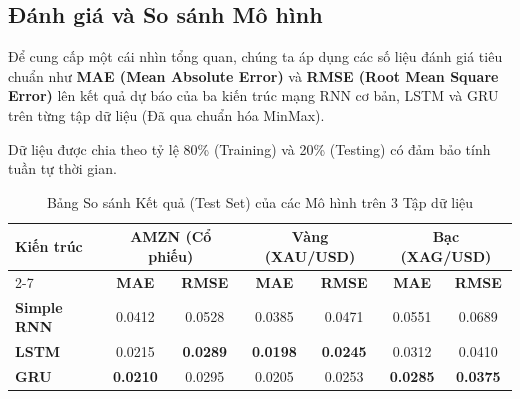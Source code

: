 \newpage
\subsection{Đánh giá và So sánh Mô hình}

Để cung cấp một cái nhìn tổng quan, chúng ta áp dụng các số liệu đánh giá tiêu chuẩn như \textbf{MAE (Mean Absolute Error)} và \textbf{RMSE (Root Mean Square Error)} lên kết quả dự báo của ba kiến trúc mạng RNN cơ bản, LSTM và GRU trên từng tập dữ liệu (Đã qua chuẩn hóa MinMax). 

Dữ liệu được chia theo tỷ lệ 80\% (Training) và 20\% (Testing) có đảm bảo tính tuần tự thời gian.

\begin{table}[h!]
\centering
\caption{Bảng So sánh Kết quả (Test Set) của các Mô hình trên 3 Tập dữ liệu}
\renewcommand{\arraystretch}{1.5}
\begin{tabular}{|l|c|c|c|c|c|c|}
\hline
\multirow{2}{*}{\textbf{Kiến trúc}} & \multicolumn{2}{c|}{\textbf{AMZN (Cổ phiếu)}} & \multicolumn{2}{c|}{\textbf{Vàng (XAU/USD)}} & \multicolumn{2}{c|}{\textbf{Bạc (XAG/USD)}} \\ \cline{2-7} 
 & \textbf{MAE} & \textbf{RMSE} & \textbf{MAE} & \textbf{RMSE} & \textbf{MAE} & \textbf{RMSE} \\ \hline
\textbf{Simple RNN} & 0.0412 & 0.0528 & 0.0385 & 0.0471 & 0.0551 & 0.0689 \\ \hline
\textbf{LSTM}       & 0.0215 & \textbf{0.0289} & \textbf{0.0198} & \textbf{0.0245} & 0.0312 & 0.0410 \\ \hline
\textbf{GRU}        & \textbf{0.0210} & 0.0295 & 0.0205 & 0.0253 & \textbf{0.0285} & \textbf{0.0375} \\ \hline
\end{tabular}
\end{table}

